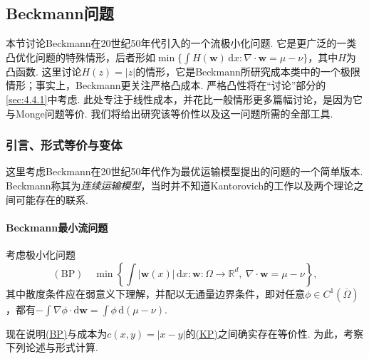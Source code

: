 \subsection{Beckmann问题}\label{sec:4.2}

本节讨论Beckmann在20世纪50年代引入的一个流极小化问题\cite{b27}. 它是更广泛的一类凸优化问题的特殊情形，后者形如$\min\{\int H(\mathbf w)\,\mathrm dx:\nabla\cdot\mathbf w=\mu-\nu\}$，其中$H$为凸函数. 这里讨论$H(z)=|z|$的情形，它是Beckmann所研究成本类中的一个极限情形；事实上，Beckmann更关注严格凸成本. 严格凸性将在“讨论”部分的\autoref{sec:4.4.1}中考虑. 此处专注于线性成本，并花比一般情形更多篇幅讨论，是因为它与Monge问题等价. 我们将给出研究该等价性以及这一问题所需的全部工具.

\subsubsection{引言、形式等价与变体}\label{sec:4.2.1}

这里考虑Beckmann在20世纪50年代作为最优运输模型提出的问题的一个简单版本. Beckmann称其为\emph{连续运输模型}，当时并不知道Kantorovich的工作以及两个理论之间可能存在的联系.

\paragraph{Beckmann最小流问题}
\begin{problem}\label{obj:4.5}
考虑极小化问题
\begin{equation}\label{eq:4.4}
 (\mathrm{BP})\quad
 \min\left\{\int|\mathbf w(x)|\,\mathrm dx:
       \mathbf w:\Omega\to\mathbb R^d,\ \nabla\cdot\mathbf w=\mu-\nu\right\},
\end{equation}
其中散度条件应在弱意义下理解，并配以无通量边界条件，即对任意$\phi\in C^1(\overline\Omega)$，都有$-\int\nabla\phi\cdot\mathrm d\mathbf w=\int\phi\,\mathrm d(\mu-\nu)$.
\end{problem}

现在说明\hyperref[obj:4.5]{(BP)}与成本为$c(x,y)=|x-y|$的\hyperref[obj:1.2]{(KP)}之间确实存在等价性. 为此，考察下列论述与形式计算.


